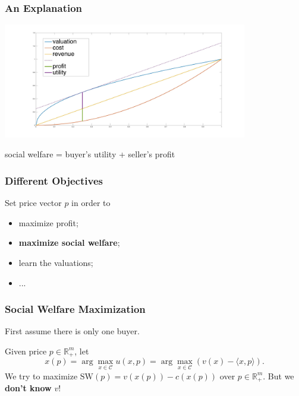 \documentclass{beamer}
\begin{document}
\begin{frame}
    \frametitle{An Explanation}
    \begin{center}
        \includegraphics[width=0.8\textwidth]{market.jpg}
    \end{center}
    \begin{center}
        social welfare = buyer's utility + seller's profit
    \end{center}
\end{frame}

\begin{frame}
    \frametitle{Different Objectives}
    Set price vector $p$ in order to
    \begin{itemize}
        \item maximize profit;
        \item \textbf{maximize social welfare};
        \item learn the valuations;
        \item ...
    \end{itemize}
\end{frame}

\begin{frame}
    \frametitle{Social Welfare Maximization}
    First assume there is only one buyer.

    Given price $p\in \mathbb{R}_+^m$, let
    \begin{equation}
        x(p)=\arg\max_{x\in \mathcal{C}}u(x,p)=\arg\max_{x\in \mathcal{C}}(v(x)-\langle x,p\rangle).
    \end{equation}
    We try to maximize $\mathrm{SW}(p)=v(x(p))-c(x(p))$ over $p\in\mathbb{R}_+^m$. But we \textbf{don't know} $v$!
\end{frame}

\end{document}
